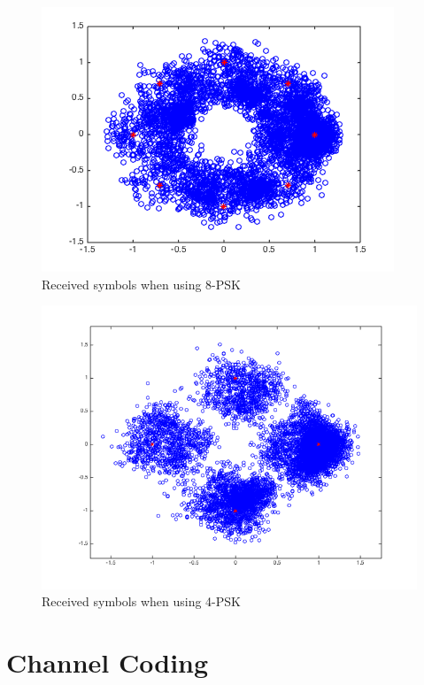 \documentclass{article}
\begin{document}
\begin{figure}
  \centering\includegraphics[width=\textwidth]{../presentation/8psk.png}
  \caption{Received symbols when using 8-PSK}
  \label{fig:8psk}
\end{figure}

\begin{figure}
  \centering\includegraphics[width=\textwidth]{../presentation/4psk.png}
  \caption{Received symbols when using 4-PSK}
  \label{fig:4psk}
\end{figure}

\section{Channel Coding}
\end{document}
